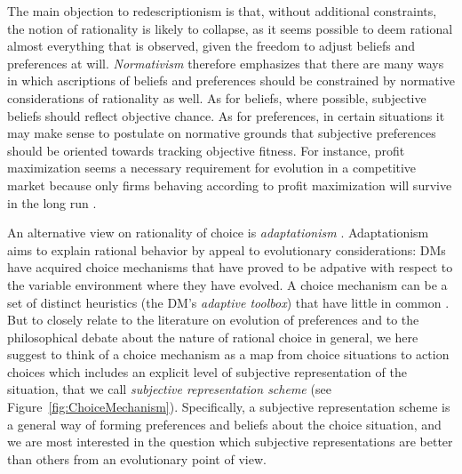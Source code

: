 \documentclass[fleqn,reqno,11pt]{article}
\begin{document}
The main objection to redescriptionism is that, without additional constraints, the notion of
rationality is likely to collapse, as it seems possible to deem rational almost everything that
is observed, given the freedom to adjust beliefs and preferences at will. \emph{Normativism}
therefore emphasizes that there are many ways in which ascriptions of beliefs and preferences
should be constrained by normative considerations of rationality as well. As for beliefs, where
possible, subjective beliefs should reflect objective chance. 
As for preferences, in certain situations it may make sense to
postulate on normative grounds that subjective preferences should be oriented towards tracking
objective fitness. For instance, profit maximization seems a necessary requirement for
evolution in a competitive market because only firms behaving according to profit maximization will survive in the long run \citep[e.g.,][]{alch50,Fried53}.

An alternative view on rationality of choice is \emph{adaptationism}
\citep[e.g.,][]{Anderson1991:Is-human-cognit,ChaterOaksford2000:The-Rational-An,HagenChater2012:Decision-Making}.  Adaptationism aims to explain rational behavior by appeal to evolutionary
considerations: DMs have acquired choice mechanisms that have proved to be adpative with respect to the variable environment where they have evolved. A choice mechanism can be a set of distinct heuristics (the DM's
\emph{adaptive toolbox}) that have little in common
\citep[e.g.,][]{TverskyKahnemann1981:The-Framing-of-,GigerenzerGoldstein1996:Reasoning-the-F,ScheibehenneRieskamp2013:Testing-the-Ada}. But
to closely relate to the literature on evolution of preferences and to the philosophical debate about the nature of rational choice in general, we here suggest to
think of a choice mechanism as a map from choice situations to action choices which includes an
explicit level of subjective representation of the situation, that we call \emph{subjective representation scheme} (see
Figure~\ref{fig:ChoiceMechanism}). Specifically, a subjective representation scheme is a general way of forming preferences and
beliefs about the choice situation, and we are most interested in the question which
subjective representations are better than others from an evolutionary point of view.
\end{document}
